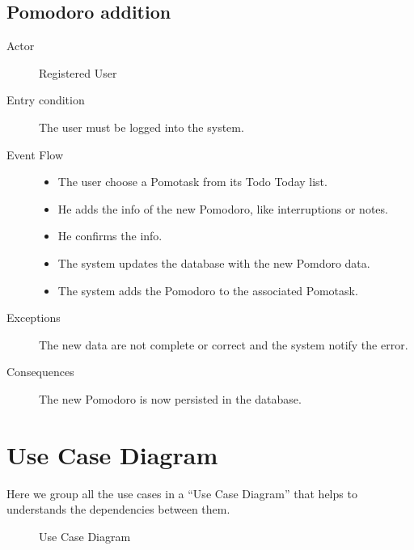 		\subsection{Pomodoro addition}

			\begin{description}

				\item[Actor] Registered User
			
				\item[Entry condition] The user must be logged into the system.

				\item[Event Flow]\hfill

					\begin{itemize}

						\item The user choose a Pomotask from its Todo Today list.

						\item He adds the info of the new Pomodoro, like interruptions or notes.

						\item He confirms the info.

						\item The system updates the database with the new Pomdoro data.

						\item The system adds the Pomodoro to the associated Pomotask.

					\end{itemize}

				\item[Exceptions] The new data are not complete or correct and the system notify the error.

				\item[Consequences] The new Pomodoro is now persisted in the database.

			\end{description}


	\section{Use Case Diagram}

	Here we group all the use cases in a ``Use Case Diagram'' that helps to understands the dependencies between them.\\


		\begin{figure}[h!]
		  \centering
		  \caption{Use Case Diagram}
		\end{figure}

	
